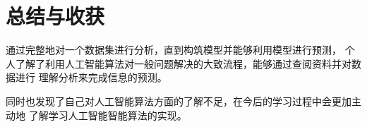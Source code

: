 \documentclass[AutoFakeBold]{LZUThesis}
\begin{document}
\chapter{总结与收获}
通过完整地对一个数据集进行分析，直到构筑模型并能够利用模型进行预测，
个人了解了利用人工智能算法对一般问题解决的大致流程，能够通过查阅资料并对数据进行
理解分析来完成信息的预测。

同时也发现了自己对人工智能算法方面的了解不足，在今后的学习过程中会更加主动地
了解学习人工智能智能算法的实现。
\backmatter


\printbib
\nocite{*} %




\end{document}
